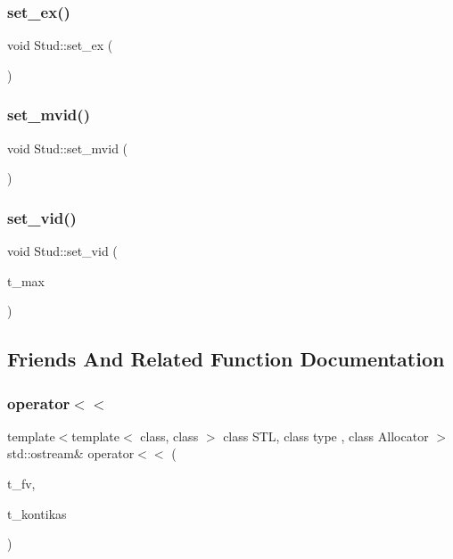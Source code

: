 \mbox{\label{class_stud_a39a9a5b2fcf459c3e56396a418694e5c}} 
\subsubsection{\texorpdfstring{set\_ex()}{set\_ex()}\hspace{0.1cm}{\footnotesize\ttfamily [2/2]}}
{\footnotesize\ttfamily void Stud\+::set\+\_\+ex (\begin{DoxyParamCaption}{ }\end{DoxyParamCaption})}

\mbox{\label{class_stud_a7ed1b42af6ad111a12c7aa21f922a01b}} 
\subsubsection{\texorpdfstring{set\_mvid()}{set\_mvid()}}
{\footnotesize\ttfamily void Stud\+::set\+\_\+mvid (\begin{DoxyParamCaption}{ }\end{DoxyParamCaption})}

\mbox{\label{class_stud_a05d3a2f528ab191cb5d029c361fac3b7}} 
\subsubsection{\texorpdfstring{set\_vid()}{set\_vid()}}
{\footnotesize\ttfamily void Stud\+::set\+\_\+vid (\begin{DoxyParamCaption}\item[{int}]{t\+\_\+max }\end{DoxyParamCaption})}



\subsection{Friends And Related Function Documentation}
\mbox{\label{class_stud_ac58e1fdedfbed178b8d5c57069020996}} 
\subsubsection{\texorpdfstring{operator$<$$<$}{operator<<}}
{\footnotesize\ttfamily template$<$template$<$ class, class $>$ class S\+TL, class type , class Allocator $>$ \\
std\+::ostream\& operator$<$$<$ (\begin{DoxyParamCaption}\item[{std\+::ostream \&}]{t\+\_\+fv,  }\item[{S\+TL$<$ type, Allocator $>$ \&}]{t\+\_\+kontikas }\end{DoxyParamCaption})\hspace{0.3cm}{\ttfamily [friend]}}

